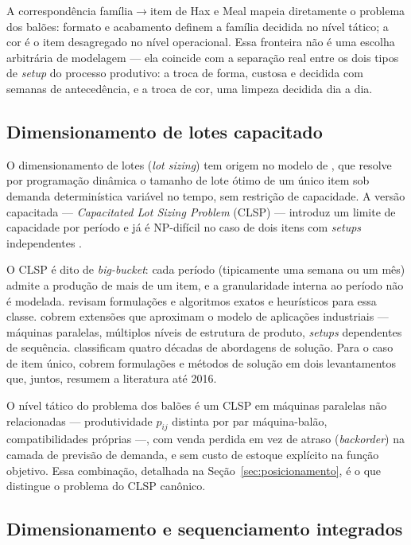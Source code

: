 \documentclass[fleqn,12pt,a4paper]{article}
\begin{document}
A correspondência família$\to$item de Hax e Meal mapeia diretamente o problema dos balões: formato e acabamento definem a família decidida no nível tático; a cor é o item desagregado no nível operacional. Essa fronteira não é uma escolha arbitrária de modelagem --- ela coincide com a separação real entre os dois tipos de \textit{setup} do processo produtivo: a troca de forma, custosa e decidida com semanas de antecedência, e a troca de cor, uma limpeza decidida dia a dia.

\subsection{Dimensionamento de lotes capacitado}

O dimensionamento de lotes (\textit{lot sizing}) tem origem no modelo de , que resolve por programação dinâmica o tamanho de lote ótimo de um único item sob demanda determinística variável no tempo, sem restrição de capacidade. A versão capacitada --- \textit{Capacitated Lot Sizing Problem} (CLSP) --- introduz um limite de capacidade por período e já é NP-difícil no caso de dois itens com \textit{setups} independentes \cite{bitranyanasse1982,chenthizy1990}.

O CLSP é dito de \textit{big-bucket}: cada período (tipicamente uma semana ou um mês) admite a produção de mais de um item, e a granularidade interna ao período não é modelada.  revisam formulações e algoritmos exatos e heurísticos para essa classe.  cobrem extensões que aproximam o modelo de aplicações industriais --- máquinas paralelas, múltiplos níveis de estrutura de produto, \textit{setups} dependentes de sequência.  classificam quatro décadas de abordagens de solução. Para o caso de item único,  cobrem formulações e métodos de solução em dois levantamentos que, juntos, resumem a literatura até 2016.

O nível tático do problema dos balões é um CLSP em máquinas paralelas não relacionadas --- produtividade $p_{ij}$ distinta por par máquina-balão, compatibilidades próprias ---, com venda perdida em vez de atraso (\textit{backorder}) na camada de previsão de demanda, e sem custo de estoque explícito na função objetivo. Essa combinação, detalhada na Seção~\ref{sec:posicionamento}, é o que distingue o problema do CLSP canônico.

\subsection{Dimensionamento e sequenciamento integrados}
\end{document}
